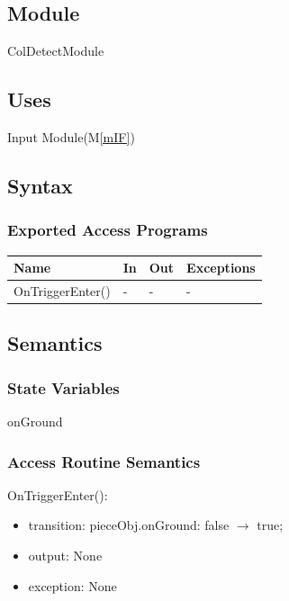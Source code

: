 \documentclass[12pt, titlepage]{article}
\newcommand{\mref}[1]{M\ref{#1}}
\begin{document}
\subsection{Module}

ColDetectModule

\subsection{Uses}

Input Module(\mref{mIF})

\subsection{Syntax}

\subsubsection{Exported Access Programs}

\begin{center}
	\begin{tabular}{p{4cm} p{4cm} p{4cm} p{2cm}}
		\hline
		\textbf{Name} & \textbf{In} & \textbf{Out} & \textbf{Exceptions} \\
		\hline
		OnTriggerEnter() & - & - & - \\
		\hline
	\end{tabular}
\end{center}

\subsection{Semantics}

\subsubsection{State Variables}

onGround

\subsubsection{Access Routine Semantics}

\noindent OnTriggerEnter():
\begin{itemize}
	\item transition: pieceObj.onGround: false $\to$ true;
	\item output: None 
	\item exception: None 
\end{itemize}
\end{document}
